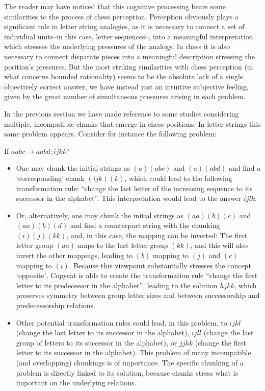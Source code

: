 The reader may have noticed that this cognitive processing bears some similarities to the process of chess perception.  Perception obviously plays a significant role in letter string analogies, as it is necessary to connect a set of individual units--in this case, letter sequences--, into a meaningful interpretation which stresses the underlying pressures of the analogy. In chess it is also necessary to connect disparate pieces into a meaningful description stressing the position’s pressures.   But the most striking similarities with chess perception (in what concerns bounded rationality) seems to be the absolute lack of a single objectively correct answer, we have instead just an intuitive subjective feeling, given by the great number of simultaneous pressures arising in each problem.  

In the previous section we have made reference to some studies considering multiple, incompatible chunks that emerge in chess positions. In letter strings this same problem appears.  Consider for instance the following problem:  

If $aabc\to aabd: ijkk?$  

\begin{itemize}
\item One may chunk the initial strings as $(a)(abc)$ and $(a)(abd)$ and find a `corresponding’ chunk $(ijk)(k)$, which could lead to the following transformation rule: “change the last letter of the increasing sequence to its successor in the alphabet”. This interpretation would lead to the answer $ijlk$.

\item Or, alternatively, one may chunk the initial strings as $(aa)(b)(c)$ and $(aa)(b)(d)$ and find a counterpart string with the chunking $(i)(j)(kk)$, and, in this case, the mapping can be inverted:  The first letter group $(aa)$ maps to the last letter group $(kk)$, and this will also invert the other mappings, leading to $(b)$ mapping to $(j)$ and $(c)$ mapping to $(i)$.  Because this viewpoint substantially stresses the concept `opposite’, Copycat is able to create the transformation rule “change the first letter to its predecessor in the alphabet”, leading to the solution $hjkk$, which preserves symmetry between group letter sizes and between successorship and predecessorship relations.

\item Other potential transformation rules could lead, in this problem, to $ijkl$ (change the last letter to its successor in the alphabet), $ijll$ (change the last group of letters to its successor in the alphabet), or $jjkk$ (change the first letter to its successor in the alphabet). This problem of many incompatible (and overlapping) chunkings is of importance.  The specific chunking of a problem is directly linked to its solution, because chunks stress what is important on the underlying relations. 
\end{itemize}

